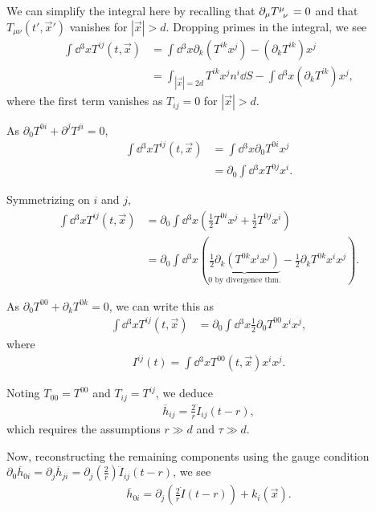 We can simplify the integral here by recalling that $\partial_\mu \tensor{T}{^{\mu}_\nu} = 0$ and that $T_{\mu \nu}\left( t', \vec{x}' \right) $ vanishes for $\left| \vec{x} \right| > d$. Dropping primes in the integral, we see
\begin{align}
    \int \dd{^3x} T^{ij}\left( t,\vec{x} \right) &= \int \dd{^3x} \partial_k \left( T^{ik} x^{j} \right) - \left( \partial_k T^{ik} \right) x^{j} \\
    &= \int_{\left| \vec{x} \right| = 2d} T^{ik} x^{j} n^{i} \dd{S} - \int \dd{^3x} \left( \partial_k T^{ik} \right) x^{j}
,\end{align}
where the first term vanishes as $T_{ij} = 0$ for $\left| \vec{x} \right| > d$.

As $\partial_0 T^{0i} + \partial^{j} T^{ji} = 0$,
\begin{align}
    \int \dd{^3x} T^{ij}\left( t,\vec{x} \right) &= \int \dd{^3x} \partial_0 T^{0i} x^{j} \\
    &= \partial_0 \int \dd{^3x} T^{0j} x^{i}
.\end{align}

Symmetrizing on $i$ and $j$,
\begin{align}
    \int \dd{^3x} T^{ij}\left( t,\vec{x} \right) &= \partial_0 \int \dd{^3x} \left( \frac{1}{2} T^{0i} x^{j} + \frac{1}{2} T^{0j} x^{i} \right)  \\
    &= \partial_0 \int \dd{^3x} \left( \underbrace{\frac{1}{2} \partial_k \left( T^{0k} x^{i} x^{j} \right)}_{\text{0 by divergence thm.}} - \frac{1}{2} \partial_k T^{0k} x^{i} x^{j}   \right) 
.\end{align}

As $\partial_0 T^{00} + \partial_k T^{0k} = 0$, we can write this as
\begin{align}
    \int \dd{^3x} T^{ij}\left( t,\vec{x} \right) &= \partial_0 \int \dd{^3x} \frac{1}{2} \partial_0 T^{00} x^{i} x^{j}
,\end{align}
where
\begin{align}
    I^{ij}\left( t \right) = \int \dd{^3x} T^{00}\left( t,\vec{x} \right) x^{i} x^{j}
.\end{align}

Noting $T_{00} = T^{00}$ and $T_{ij} = T^{ij}$, we deduce
\begin{align}
    \overline{h}_{ij} = \frac{2}{r} \ddot{I}_{ij}\left( t-r \right)
,\end{align}
which requires the assumptions $r \gg d$ and $\tau \gg d$.

Now, reconstructing the remaining components using the gauge condition $\partial_0 \overline{h}_{0i} = \partial_j \overline{h}_{ji} = \partial_j \left( \frac{2}{r} \right) \ddot{I}_{ij}\left( t - r \right) $, we see
\begin{align}
    \overline{h}_{0i} = \partial_j \left( \frac{2}{r} \dot{I} \left( t - r \right)  \right) +k_{i}\left( \vec{x} \right)
.\end{align}

